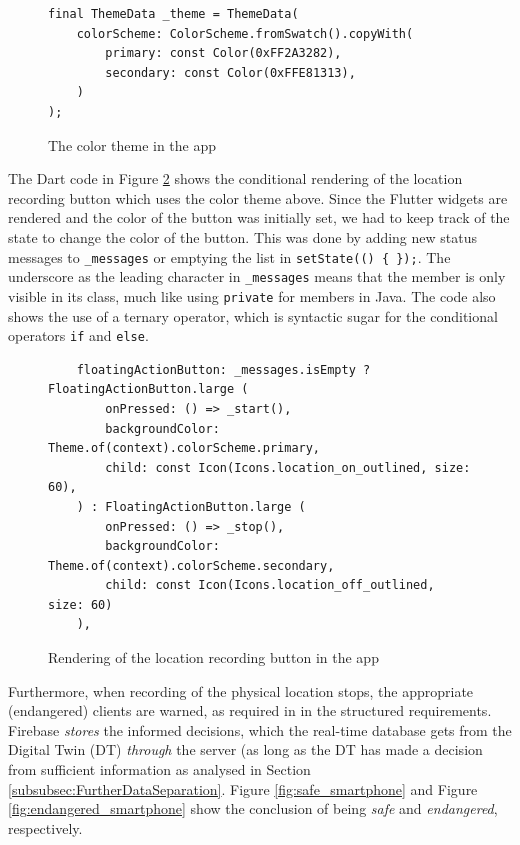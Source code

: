 \documentclass{article}
\begin{document}
\begin{figure}[H]
    \centering
    \begin{verbatim}
final ThemeData _theme = ThemeData(
    colorScheme: ColorScheme.fromSwatch().copyWith(
        primary: const Color(0xFF2A3282),
        secondary: const Color(0xFFE81313),
    )
);
\end{verbatim}
    \caption{The color theme in the app}
    \label{fig:color_theme}
\end{figure}



The Dart code in Figure \ref{fig:location_toggle} shows the conditional rendering of the location recording button which uses the color theme above. Since the Flutter widgets are rendered and the color of the button was initially set, we had to keep track of the state to change the color of the button. This was done by adding new status messages to \verb|_messages| or emptying the list in \verb|setState(() { });|. The underscore as the leading character in \verb|_messages| means that the member is only visible in its class, much like using \verb|private| for members in Java. The code also shows the use of a ternary operator, which is syntactic sugar for the conditional operators \verb|if| and \verb|else|.
\begin{figure}[H]
    \centering
    \begin{verbatim}
    floatingActionButton: _messages.isEmpty ? FloatingActionButton.large (
        onPressed: () => _start(),
        backgroundColor: Theme.of(context).colorScheme.primary,
        child: const Icon(Icons.location_on_outlined, size: 60),
    ) : FloatingActionButton.large (
        onPressed: () => _stop(),
        backgroundColor: Theme.of(context).colorScheme.secondary,
        child: const Icon(Icons.location_off_outlined, size: 60)
    ),
    \end{verbatim}
    \caption{Rendering of the location recording button in the app}
    \label{fig:location_toggle}
\end{figure}

Furthermore, when recording of the physical location stops, the appropriate (endangered) clients are warned, as required in in the structured requirements. Firebase \emph{stores} the informed decisions, which the real-time database gets from the Digital Twin (DT) \emph{through} the server (as long as the DT has made a decision from sufficient information as analysed in Section \ref{subsubsec:FurtherDataSeparation}. Figure \ref{fig:safe_smartphone} and Figure \ref{fig:endangered_smartphone} show the conclusion of being \emph{safe} and \emph{endangered}, respectively.
\end{document}
